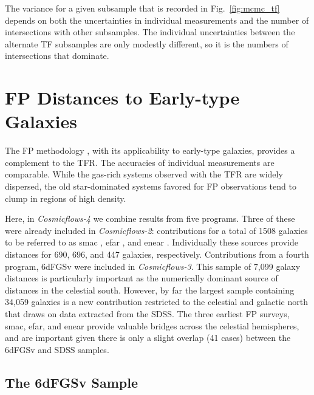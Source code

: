 \documentclass[twocolumn]{aastex63}
\begin{document}
The variance for a given subsample that is recorded in Fig.~\ref{fig:mcmc_tf} depends on both the uncertainties in individual measurements and the number of intersections with other subsamples.  The individual uncertainties between the alternate TF subsamples are only modestly different, so it is the numbers of intersections that dominate. 


\section{FP Distances to Early-type Galaxies}
\label{sec:FP}

The FP methodology \citep{1987ApJ...313...42D, 1987ApJ...313...59D}, with its applicability to early-type galaxies, provides a complement to the TFR.  The accuracies of individual measurements are comparable. While the gas-rich systems observed with the TFR are widely dispersed, the old star-dominated systems favored for FP observations tend to clump in regions of high density.

Here, in {\it Cosmicflows-4} we combine results from five programs.  Three of these were already included in {\it Cosmicflows-2}: contributions for a total of 1508 galaxies to be referred to as smac \citep{2001MNRAS.327..265H}, efar \citep{2001MNRAS.321..277C}, and enear \citep{2002AJ....123.2990B}.  Individually these sources provide distances for 690, 696, and 447 galaxies, respectively.
Contributions from a fourth program, 6dFGSv \citep{2014MNRAS.445.2677S} were included in {\it Cosmicflows-3}.  This sample of 7,099 galaxy distances is particularly important as the numerically dominant source of distances in the celestial south.  However, by far the largest sample containing 34,059 galaxies is a new contribution restricted to the celestial and galactic north that draws on data extracted from the SDSS.
The three earliest FP surveys, smac, efar, and enear provide valuable bridges across the celestial hemispheres, and are important given there is only a slight overlap (41 cases) between the 6dFGSv and SDSS samples. 




\subsection{The 6dFGSv Sample}
\label{sec:6dF}
\end{document}
